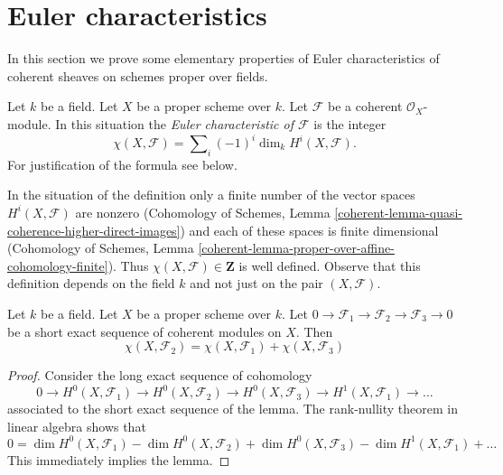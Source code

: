\section{Euler characteristics}
\label{section-euler}

\noindent
In this section we prove some elementary properties of Euler characteristics
of coherent sheaves on schemes proper over fields.

\begin{definition}
\label{definition-euler-characteristic}
Let $k$ be a field. Let $X$ be a proper scheme over $k$. Let $\mathcal{F}$
be a coherent $\mathcal{O}_X$-module. In this situation the
{\it Euler characteristic of $\mathcal{F}$} is the integer
$$
\chi(X, \mathcal{F}) = \sum\nolimits_i (-1)^i \dim_k H^i(X, \mathcal{F}).
$$
For justification of the formula see below.
\end{definition}

\noindent
In the situation of the definition only a finite number of the vector spaces
$H^i(X, \mathcal{F})$ are nonzero (Cohomology of Schemes, Lemma
\ref{coherent-lemma-quasi-coherence-higher-direct-images})
and each of these spaces is finite dimensional
(Cohomology of Schemes, Lemma
\ref{coherent-lemma-proper-over-affine-cohomology-finite}). Thus
$\chi(X, \mathcal{F}) \in \mathbf{Z}$ is well defined. Observe that
this definition depends on the field $k$ and not just on the pair
$(X, \mathcal{F})$.

\begin{lemma}
\label{lemma-euler-characteristic-additive}
Let $k$ be a field. Let $X$ be a proper scheme over $k$.
Let $0 \to \mathcal{F}_1 \to \mathcal{F}_2 \to \mathcal{F}_3 \to 0$
be a short exact sequence of coherent modules on $X$. Then
$$
\chi(X, \mathcal{F}_2) = \chi(X, \mathcal{F}_1) + \chi(X, \mathcal{F}_3)
$$
\end{lemma}

\begin{proof}
Consider the long exact sequence of cohomology
$$
0 \to H^0(X, \mathcal{F}_1) \to H^0(X, \mathcal{F}_2) \to
H^0(X, \mathcal{F}_3) \to H^1(X, \mathcal{F}_1) \to \ldots
$$
associated to the short exact sequence of the lemma. The rank-nullity theorem
in linear algebra shows that
$$
0 = \dim H^0(X, \mathcal{F}_1) - \dim H^0(X, \mathcal{F}_2)
+ \dim H^0(X, \mathcal{F}_3) - \dim H^1(X, \mathcal{F}_1) + \ldots
$$
This immediately implies the lemma.
\end{proof}

